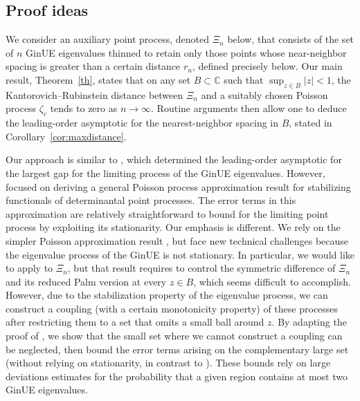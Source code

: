 \documentclass{amsart}
\theoremstyle{plain}
\theoremstyle{definition}
\theoremstyle{remark}
\begin{document}
\subsection{Proof ideas} We consider an auxiliary point process, denoted $\Xi_{n}$ below, that consists of the set of $n$ GinUE eigenvalues thinned to retain only those points whose near-neighbor spacing is greater than a certain distance $r_{n}$, defined precisely below.    
Our main result, Theorem~\ref{th}, states that on any set $B\subset \mathbb{C}$ such that $\sup_{z \in B} |z|<1$, the Kantorovich--Rubinstein distance between $\Xi_{n}$ and a suitably chosen Poisson process $\zeta_c$ tends to zero as $n \rightarrow \infty$. Routine arguments then allow one to deduce the leading-order asymptotic for the nearest-neighbor spacing in $B$, stated in Corollary~\ref{cor:maxdistance}. 

Our approach is similar to \cite{O24}, which determined the leading-order asymptotic for the largest gap for the limiting process of the GinUE eigenvalues. However, \cite{O24} focused on deriving a general Poisson process approximation result for stabilizing functionals of determinantal point processes. The error terms in this approximation are relatively straightforward to bound for the limiting point process by exploiting its stationarity. Our emphasis is different. We rely on the simpler Poisson approximation result \cite[Theorem 3.1]{BSY21}, but face new technical challenges because the eigenvalue process of the GinUE is not stationary. 
In particular, we would like to apply \cite[Theorem 3.1]{BSY21} to $\Xi_{n}$, but that result requires to control the symmetric difference of $\Xi_{n}$ and its reduced Palm version at every $z \in B$, which seems difficult to accomplish. However, due to the stabilization property of the eigenvalue process, we can construct a coupling (with a certain monotonicity property) of these processes after restricting them to a set that omits a small ball around $z$. By adapting the proof of  \cite[Theorem 3.1]{BSY21}, we show that the small set where we cannot construct a coupling can be neglected, then bound the error terms arising on the complementary large set (without relying on stationarity, in contrast to \cite{O24}). These bounds rely on large deviations estimates for the probability that a given region contains at most two GinUE eigenvalues. 
\end{document}
